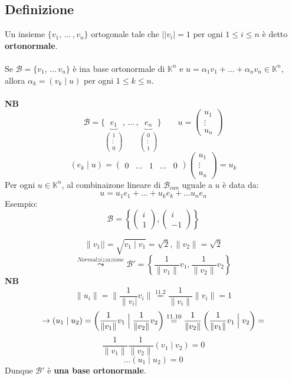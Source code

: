 \documentclass[12pt]{article}
\begin{document}
\subsection{Definizione}

Un insieme $\{v_1, \, \dots \,, v_n\}$ ortogonale tale che \(||v_i| = 1\) per ogni $1 \le i \le n$ è detto \textbf{ortonormale}.
\\\\
Se $\mathcal{B} = \{v_1, \, \dots \, v_n\}$ è ina base ortonormale di $\mathbb{K}^n$ e $u = \alpha_1 v_1 + \dots + \alpha_n v_n \in \mathbb{K}^n$, allora $\alpha_k = (v_k \mid u)$ per ogni $1 \le k \le n$.\\\\
\textbf{NB}
\[\mathcal{B} = \{\underbrace{e_1}_{\begin{pmatrix}
    1\\
    \vdots\\
    0
\end{pmatrix}}, \, \dots \, ,\underbrace{e_n}_{\begin{pmatrix}
    0\\
    \vdots\\
    1
\end{pmatrix}}\} \quad \quad u  =\begin{pmatrix}
    u_1\\
    \vdots\\
    u_n
\end{pmatrix}\]
\[(e_k \mid u) = \begin{pmatrix}
    0 & \dots&  1 & \dots & 0
\end{pmatrix} \begin{pmatrix}
    u_1\\
    \vdots\\
    u_n
\end{pmatrix} = u_k\]
Per ogni $u \in \mathbb{K}^n$, al combinaizone lineare di $\mathcal{B}_{can}$ uguale a $u$ è data da:
\[u = u_1e_1 + \dots + u_ke_k + \dots u_ne_n\]
Esempio:
\[\mathcal{B} = \left\{\begin{pmatrix}
    i\\
    1
\end{pmatrix}, \begin{pmatrix}
    i\\
    -1
\end{pmatrix}\right\}\]

\[\|v_1||= \sqrt{v_1 \mid v_1} = \sqrt{2}, \|v_2\|= \sqrt{2}\]
\[\stackrel{Normalzizzazione}{\leadsto} \mathcal{B}' = \left\{\frac{1}{\|v_1\|}v_1 , \frac{1}{\|v_2\|}v_2 \right\}\]
\textbf{NB}
\[\|u_i\| = \|\frac{1}{\|v_i|}v_i\| \stackrel{11.2}{=} \frac{1}{\|v_i\|}\|v_i\| = 1 \]
\[ \rightarrow (u_1 \mid u_2) = \left(\frac{1}{\|v_1\|}v_1    \Bigm\vert \frac{1}{\|v_2\|}v_2     \right) \stackrel{11.10}{=}  \frac{1}{\|v_2\|} \left(\frac{1}{\|v_1\|}v_1    \Bigm\vert v_2     \right) = \]
\[\frac{1}{\|v_1\|} \frac{1}{\|v_2\|}\left(v_1  \mid v_2   \right) = 0\]
\[\dots (u_1 \mid u_2) = 0\]
Dunque $\mathcal{B}'$ è \textbf{una base ortonormale}.
\end{document}
